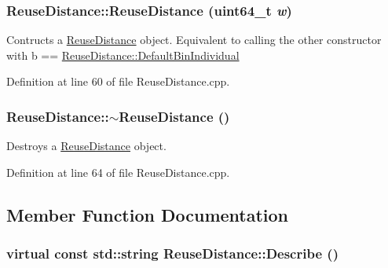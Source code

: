 \hypertarget{class_reuse_distance_ab68a2d9df5c28571c3f8820c5344b2c1}{
\subsubsection[{ReuseDistance}]{\setlength{\rightskip}{0pt plus 5cm}ReuseDistance::ReuseDistance (uint64\_\-t {\em w})}}
\label{class_reuse_distance_ab68a2d9df5c28571c3f8820c5344b2c1}
Contructs a \hyperlink{class_reuse_distance}{ReuseDistance} object. Equivalent to calling the other constructor with b == \hyperlink{class_reuse_distance_af0d9cba7105109e89ae6b7177f54c976}{ReuseDistance::DefaultBinIndividual} 

Definition at line 60 of file ReuseDistance.cpp.

\hypertarget{class_reuse_distance_a2846a6f2c045759657b754838045900d}{
\subsubsection[{$\sim$ReuseDistance}]{\setlength{\rightskip}{0pt plus 5cm}ReuseDistance::$\sim$ReuseDistance ()}}
\label{class_reuse_distance_a2846a6f2c045759657b754838045900d}
Destroys a \hyperlink{class_reuse_distance}{ReuseDistance} object. 

Definition at line 64 of file ReuseDistance.cpp.



\subsection{Member Function Documentation}
\hypertarget{class_reuse_distance_a6ef63a5e5b15c5dce387e026d40d6ef2}{
\subsubsection[{Describe}]{\setlength{\rightskip}{0pt plus 5cm}virtual const std::string ReuseDistance::Describe ()}}
\label{class_reuse_distance_a6ef63a5e5b15c5dce387e026d40d6ef2}


